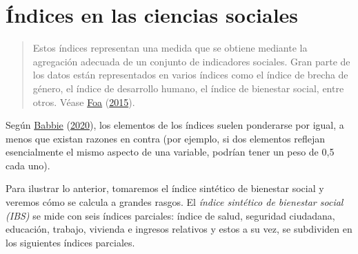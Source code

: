 \documentclass[
  11pt,
]{book}
\begin{document}
\hypertarget{uxedndices-en-las-ciencias-sociales}{%
\section{Índices en las ciencias sociales}\label{uxedndices-en-las-ciencias-sociales}}

\begin{quote}
Estos índices representan una medida que se obtiene mediante la agregación adecuada de un conjunto de indicadores sociales. Gran parte de los datos están representados en varios índices como el índice de brecha de género, el índice de desarrollo humano, el índice de bienestar social, entre otros. Véase \protect\hyperlink{ref-foa2015indices}{Foa} (\protect\hyperlink{ref-foa2015indices}{2015}).
\end{quote}

Según \protect\hyperlink{ref-babbie2020practice}{Babbie} (\protect\hyperlink{ref-babbie2020practice}{2020}), los elementos de los índices suelen ponderarse por igual, a menos que existan razones en contra (por ejemplo, si dos elementos reflejan esencialmente el mismo aspecto de una variable, podrían tener un peso de 0,5 cada uno).

Para ilustrar lo anterior, tomaremos el índice sintético de bienestar social y veremos cómo se calcula a grandes rasgos. El \emph{índice sintético de bienestar social (IBS)} se mide con seis índices parciales: índice de salud, seguridad ciudadana, educación, trabajo, vivienda e ingresos relativos y estos a su vez, se subdividen en los siguientes índices parciales.
\end{document}
